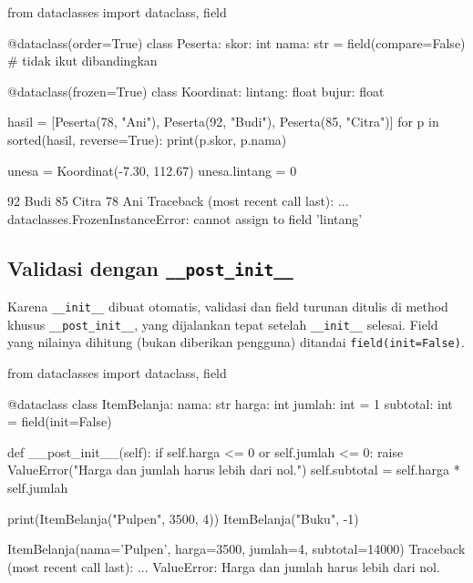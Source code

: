 \begin{kode}
from dataclasses import dataclass, field

@dataclass(order=True)
class Peserta:
    skor: int
    nama: str = field(compare=False)      # tidak ikut dibandingkan

@dataclass(frozen=True)
class Koordinat:
    lintang: float
    bujur: float

hasil = [Peserta(78, "Ani"), Peserta(92, "Budi"), Peserta(85, "Citra")]
for p in sorted(hasil, reverse=True):
    print(p.skor, p.nama)

unesa = Koordinat(-7.30, 112.67)
unesa.lintang = 0
\end{kode}

\begin{keluaran}
92 Budi
85 Citra
78 Ani
Traceback (most recent call last):
  ...
dataclasses.FrozenInstanceError: cannot assign to field 'lintang'
\end{keluaran}

\subsection{Validasi dengan \texttt{\_\_post\_init\_\_}}

Karena \texttt{\_\_init\_\_} dibuat otomatis, validasi dan field turunan ditulis di method khusus \texttt{\_\_post\_init\_\_}, yang dijalankan tepat setelah \texttt{\_\_init\_\_} selesai. Field yang nilainya dihitung (bukan diberikan pengguna) ditandai \texttt{field(init=False)}.

\begin{kode}
from dataclasses import dataclass, field

@dataclass
class ItemBelanja:
    nama: str
    harga: int
    jumlah: int = 1
    subtotal: int = field(init=False)

    def __post_init__(self):
        if self.harga <= 0 or self.jumlah <= 0:
            raise ValueError("Harga dan jumlah harus lebih dari nol.")
        self.subtotal = self.harga * self.jumlah

print(ItemBelanja("Pulpen", 3500, 4))
ItemBelanja("Buku", -1)
\end{kode}

\begin{keluaran}
ItemBelanja(nama='Pulpen', harga=3500, jumlah=4, subtotal=14000)
Traceback (most recent call last):
  ...
ValueError: Harga dan jumlah harus lebih dari nol.
\end{keluaran}

